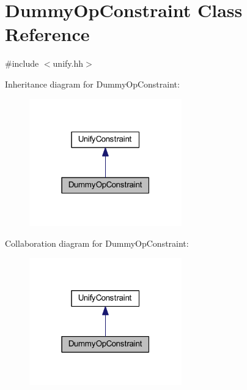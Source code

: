 \hypertarget{class_dummy_op_constraint}{}\section{Dummy\+Op\+Constraint Class Reference}
\label{class_dummy_op_constraint}


{\ttfamily \#include $<$unify.\+hh$>$}



Inheritance diagram for Dummy\+Op\+Constraint\+:
\nopagebreak
\begin{figure}[H]
\begin{center}
\leavevmode
\includegraphics[width=187pt]{class_dummy_op_constraint__inherit__graph}
\end{center}
\end{figure}


Collaboration diagram for Dummy\+Op\+Constraint\+:
\nopagebreak
\begin{figure}[H]
\begin{center}
\leavevmode
\includegraphics[width=187pt]{class_dummy_op_constraint__coll__graph}
\end{center}
\end{figure}
